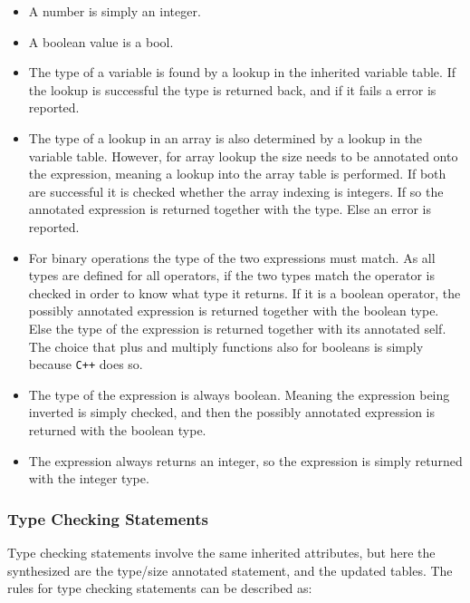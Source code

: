 \begin{itemize}
    \item A number is simply an integer.

    \item A boolean value is a bool.

    \item The type of a variable is found by a lookup in the inherited variable table.
          If the lookup is successful the type is returned back, and if it fails a error
          is reported.

    \item The type of a lookup in an array is also determined by a lookup in the variable table.
          However, for array lookup the size needs to be annotated onto the expression, meaning
          a lookup into the array table is performed. If both are successful it is checked
          whether the array indexing is integers. If so the annotated
          expression is returned together with the type. Else an error is reported.

    \item For binary operations the type of the two expressions must match. As all types
          are defined for all operators, if the two types match the operator is checked in order
          to know what type it returns. If it is a boolean operator, the possibly annotated
          expression is returned together with the boolean type. Else the type of the expression
          is returned together with its annotated self. The choice that plus and multiply
          functions also for booleans is simply because \texttt{C++} does so.
        
    \item The type of the  expression is always boolean. Meaning the expression
          being inverted is simply checked, and then the possibly annotated expression is
          returned with the boolean type.

    \item The  expression always returns an integer, so the expression is simply
          returned with the integer type.
\end{itemize}

\subsubsection{Type Checking Statements}
Type checking statements involve the same inherited attributes, but here the synthesized are
the type/size annotated statement, and the updated tables.
The rules for type checking statements can be described as:

